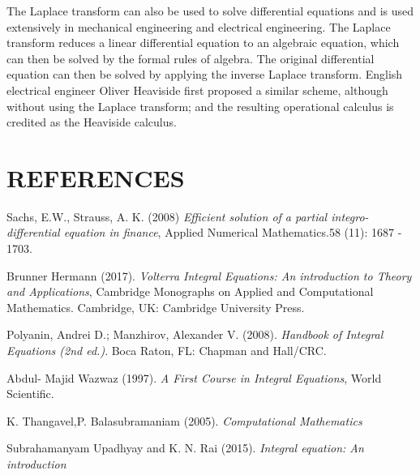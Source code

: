 \documentclass[11pt]{report}
\begin{document}
	The Laplace transform can also be used to solve differential equations and is used extensively in mechanical engineering and electrical engineering. The Laplace transform reduces a linear differential equation to an algebraic equation, which can then be solved by the formal rules of algebra. The original differential equation can then be solved by applying the inverse Laplace transform. English electrical engineer Oliver Heaviside first proposed a similar scheme, although without using the Laplace transform; and the resulting operational calculus is credited as the Heaviside calculus.
 
	
	
	\chapter*{REFERENCES}
	
	\begin{description}
		\item Sachs, E.W., Strauss, A. K. (2008) \emph{Efficient solution of a partial integro-differential equation in finance}, Applied Numerical Mathematics.58 (11): 1687 - 1703.
		
		\item Brunner Hermann (2017). \emph{Volterra Integral Equations: An introduction to Theory and Applications}, Cambridge Monographs on Applied and Computational Mathematics. Cambridge, UK: Cambridge University Press.
		
		\item Polyanin, Andrei D.; Manzhirov, Alexander V. (2008).
		\emph{Handbook of Integral Equations (2nd ed.)}. Boca Raton, FL: Chapman and Hall/CRC.
		
		\item Abdul- Majid Wazwaz (1997). \emph{A First Course in Integral Equations}, World Scientific.
		
		\item K. Thangavel,P. Balasubramaniam (2005). \emph{Computational Mathematics}
		
		\item Subrahamanyam Upadhyay and K. N. Rai (2015). \emph{Integral equation: An introduction}
	\end{description}
	
\end{document}
